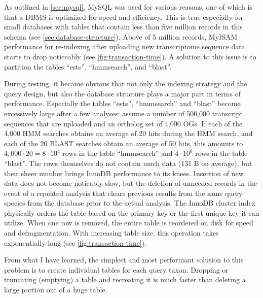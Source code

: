 As outlined in \autoref{sec:mysql}, MySQL was used for various reasons, one of
which is that a DBMS is optimized for speed and efficiency. This is true
especially for small databases with tables that contain less than five million
records in this schema (see \autoref{sec:database-structure}). Above of 5
million records, MyISAM performance for re-indexing after uploading new
transcriptome sequence data starts to drop noticeably (see
\autoref{fig:transaction-time}). A solution to this issue is to partition the
tables ``ests'', ``hmmsearch'', and ``blast''. 



During testing, it became obvious that not only the indexing strategy and the
query design, but also the database structure plays a major part in terms of
performance. Especially the tables ``ests'', ``hmmsearch'' and ``blast'' become
excessively large after a few analyses: assume a number of 500,000 transcript
sequences that are uploaded and an ortholog set of 4,000 OGs. If each of the
4,000 HMM searches obtains an average of 20 hits during the HMM search, and each
of the 20 BLAST searches obtain an average of 50 hits, this amounts to $4,000
\cdot 20 = 8 \cdot 10^4$ rows in the table ``hmmsearch'' and $4 \cdot 10^6$ rows in the
table ``blast''. The rows themselves do not contain much data (131 B
on average), but their sheer number brings InnoDB performance to its knees.
Insertion of new data does not become noticably slow, but the deletion of
unneeded records in the event of a repeated analysis that clears previous
results from the same query species from the database prior to the actual
analysis. The InnoDB cluster index physically orders the table based on the
primary key or the first unique key it can utilize. When one row is removed, the
entire table is reordered on disk for speed and defragmentation. With increasing
table size, this operation takes exponentially long (see
\autoref{fig:transaction-time}).

From what I have learned, the simplest and most performant solution to this
problem is to create individual tables for each query taxon. Dropping or
truncating (emptying) a table and recreating it is much faster than deleting a
large portion out of a huge table. 
